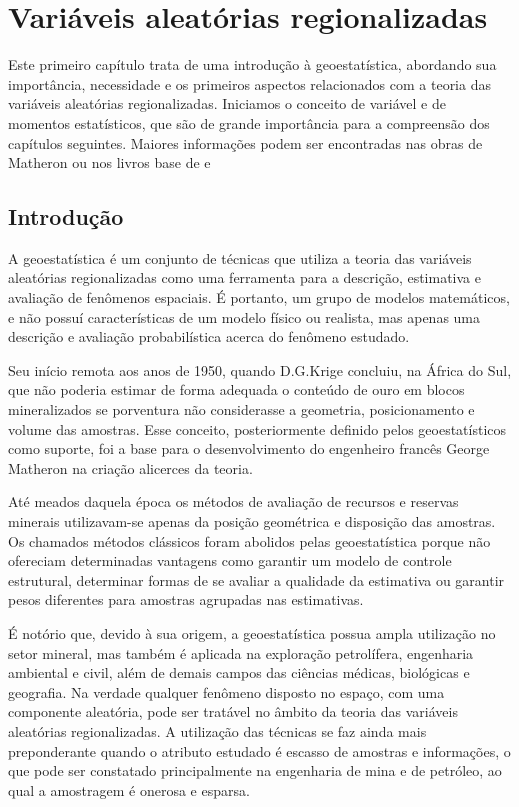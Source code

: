 


\chapter{Variáveis aleatórias regionalizadas}

Este primeiro capítulo trata de uma introdução à geoestatística, abordando sua importância, necessidade e os primeiros aspectos relacionados com a teoria das variáveis aleatórias regionalizadas. Iniciamos o conceito de variável e de momentos estatísticos, que são de grande importância para a compreensão dos capítulos seguintes. Maiores informações podem ser encontradas nas obras de Matheron \cite{matheron1963principles} ou nos livros base de \cite{isaaks1989applied} e \cite{goovaerts1997geostatistics}


\section{Introdução} 

A geoestatística é um conjunto de técnicas que utiliza a teoria das variáveis aleatórias regionalizadas como uma ferramenta para a descrição, estimativa e avaliação de fenômenos espaciais. É portanto, um grupo de modelos matemáticos, e não possuí características de um modelo físico ou realista, mas apenas uma descrição e avaliação probabilística acerca do fenômeno estudado. 

Seu início remota aos anos de 1950, quando D.G.Krige concluiu, na África do Sul, que não poderia estimar de forma adequada o conteúdo de ouro em blocos mineralizados se porventura não considerasse a geometria, posicionamento e volume das amostras. Esse conceito, posteriormente definido pelos geoestatísticos como suporte, foi a base para o desenvolvimento do engenheiro francês George Matheron na criação alicerces da teoria. 

Até meados daquela época os métodos de avaliação de recursos e reservas minerais utilizavam-se apenas da posição geométrica e disposição das amostras. Os chamados métodos clássicos foram abolidos pelas geoestatística porque não ofereciam determinadas vantagens como garantir um modelo de controle estrutural, determinar formas de se avaliar a qualidade da estimativa ou garantir pesos diferentes para amostras agrupadas nas estimativas.  

É notório que, devido à sua origem, a geoestatística possua ampla utilização no setor mineral, mas também é aplicada na exploração petrolífera, engenharia ambiental e civil, além de demais campos das ciências médicas, biológicas e geografia. Na verdade qualquer fenômeno disposto no espaço, com uma componente aleatória, pode ser tratável no âmbito da teoria das variáveis aleatórias regionalizadas. A utilização das técnicas se faz ainda mais preponderante quando o atributo estudado é escasso de amostras e informações, o que pode ser constatado principalmente na engenharia de mina e de petróleo, ao qual a amostragem é onerosa e esparsa.

